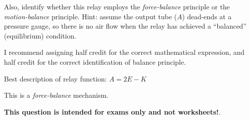 Also, identify whether this relay employs the {\it force-balance} principle or the {\it motion-balance} principle.  Hint: assume the output tube ($A$) dead-ends at a pressure gauge, so there is no air flow when the relay has achieved a ``balanced'' (equilibrium) condition.







I recommend assigning half credit for the correct mathematical expression, and half credit for the correct identification of balance principle.

\vskip 10pt

Best description of relay function:  $A = 2E - K$

\vskip 10pt

This is a {\it force-balance} mechanism.







{\bf This question is intended for exams only and not worksheets!}.



